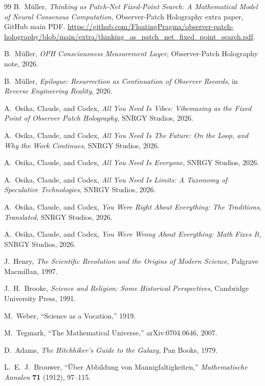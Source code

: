 \documentclass[11pt]{article}
\theoremstyle{remark}
\theoremstyle{plain}
\begin{document}
\begin{thebibliography}{99}
B.\ M\"uller,
\emph{Thinking as Patch-Net Fixed-Point Search: A Mathematical Model of Neural Consensus Computation},
Observer-Patch Holography extra paper, GitHub main PDF.
\url{https://github.com/FloatingPragma/observer-patch-holography/blob/main/extra/thinking_as_patch_net_fixed_point_search.pdf}.

B.\ M\"uller,
\emph{OPH Consciousness Measurement Layer},
Observer-Patch Holography note, 2026.

B.\ M\"uller,
\emph{Epilogue: Resurrection as Continuation of Observer Records},
in \emph{Reverse Engineering Reality}, 2026.

A.\ Osika, Claude, and Codex,
\emph{All You Need Is Vibes: Vibemaxing as the Fixed Point of Observer Patch Holography},
SNRGY Studios, 2026.

A.\ Osika, Claude, and Codex,
\emph{All You Need Is The Future: On the Loop, and Why the Work Continues},
SNRGY Studios, 2026.

A.\ Osika, Claude, and Codex,
\emph{All You Need Is Everyone},
SNRGY Studios, 2026.

A.\ Osika, Claude, and Codex,
\emph{All You Need Is Limits: A Taxonomy of Speculative Technologies},
SNRGY Studios, 2026.

A.\ Osika, Claude, and Codex,
\emph{You Were Right About Everything: The Traditions, Translated},
SNRGY Studios, 2026.

A.\ Osika, Claude, and Codex,
\emph{You Were Wrong About Everything: Math Fixes It},
SNRGY Studios, 2026.

J.\ Henry,
\emph{The Scientific Revolution and the Origins of Modern Science},
Palgrave Macmillan, 1997.

J.\ H.\ Brooke,
\emph{Science and Religion: Some Historical Perspectives},
Cambridge University Press, 1991.

M.\ Weber,
``Science as a Vocation,''
1919.

M.\ Tegmark,
``The Mathematical Universe,''
arXiv:0704.0646, 2007.

D.\ Adams,
\emph{The Hitchhiker's Guide to the Galaxy},
Pan Books, 1979.

L.\ E.\ J.\ Brouwer,
``\"Uber Abbildung von Mannigfaltigkeiten,''
\emph{Mathematische Annalen} \textbf{71} (1912), 97--115.


\end{thebibliography}
\end{document}
